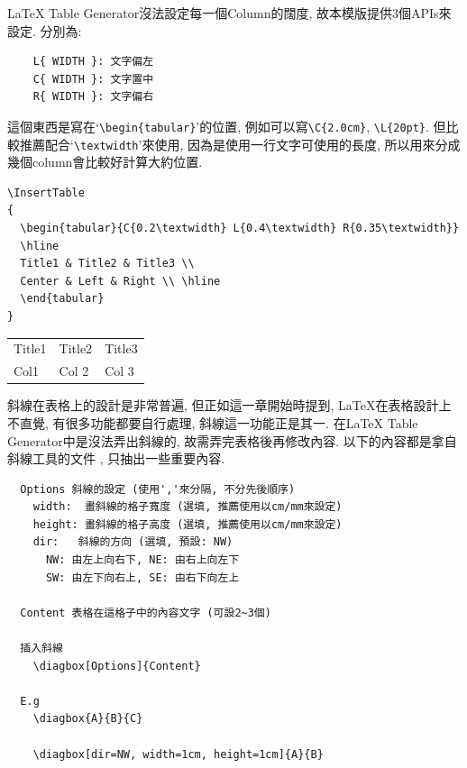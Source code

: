 \newpage
{}

LaTeX Table Generator沒法設定每一個Column的闊度, 故本模版提供3個APIs來設定. 分別為:
  \begin{verbatim}
    L{ WIDTH }: 文字偏左
    C{ WIDTH }: 文字置中
    R{ WIDTH }: 文字偏右
  \end{verbatim}
這個東西是寫在`\verb|\begin{tabular}|'的位置, 例如可以寫\verb|\C{2.0cm}|, \verb|\L{20pt}|. 但比較推薦配合`\verb|\textwidth|'來使用, 因為是使用一行文字可使用的長度, 所以用來分成幾個column會比較好計算大約位置.

\begin{verbatim}
\InsertTable
{
  \begin{tabular}{C{0.2\textwidth} L{0.4\textwidth} R{0.35\textwidth}}
  \hline
  Title1 & Title2 & Title3 \\
  Center & Left & Right \\ \hline
  \end{tabular}
}
\end{verbatim}

    \InsertTable
      {
        \begin{tabular}{C{0.2\textwidth} L{0.4\textwidth} R{0.35\textwidth}}
        \hline
        Title1 & Title2 & Title3 \\
        Col1 & Col 2 & Col 3 \\ \hline
        \end{tabular}
      }

\newpage
{}

斜線在表格上的設計是非常普遍, 但正如這一章開始時提到, LaTeX在表格設計上不直覺, 有很多功能都要自行處理, 斜線這一功能正是其一. 在LaTeX Table Generator中是沒法弄出斜線的, 故需弄完表格後再修改內容. 以下的內容都是拿自斜線工具的文件 , 只抽出一些重要內容.\\

  \begin{DescriptionFrame}
  \begin{verbatim}
  Options 斜線的設定 (使用','來分隔, 不分先後順序)
    width:  畫斜線的格子寬度 (選填, 推薦使用以cm/mm來設定)
    height: 畫斜線的格子高度 (選填, 推薦使用以cm/mm來設定)
    dir:   斜線的方向 (選填, 預設: NW)
      NW: 由左上向右下, NE: 由右上向左下
      SW: 由左下向右上, SE: 由右下向左上

  Content 表格在這格子中的內容文字 (可設2~3個)

  插入斜線
    \diagbox[Options]{Content}

  E.g
    \diagbox{A}{B}{C}

    \diagbox[dir=NW, width=1cm, height=1cm]{A}{B}
  \end{verbatim}
  \end{DescriptionFrame}

